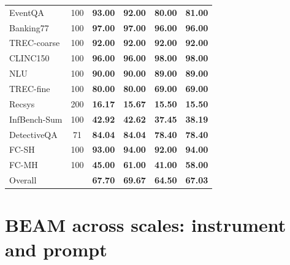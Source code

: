 \documentclass{article}
\begin{document}
\begin{table}[!htbp]
\begin{tabular}{lc>{\columncolor{oursbg}}c>{\columncolor{oursbg}}c>{\columncolor{oursbg}}c>{\columncolor{oursbg}}c}
EventQA & 100 & \textbf{93.00} & \textbf{92.00} & \textbf{80.00} & \textbf{81.00} \\
Banking77 & 100 & \textbf{97.00} & \textbf{97.00} & \textbf{96.00} & \textbf{96.00} \\
TREC-coarse & 100 & \textbf{92.00} & \textbf{92.00} & \textbf{92.00} & \textbf{92.00} \\
CLINC150 & 100 & \textbf{96.00} & \textbf{96.00} & \textbf{98.00} & \textbf{98.00} \\
NLU & 100 & \textbf{90.00} & \textbf{90.00} & \textbf{89.00} & \textbf{89.00} \\
TREC-fine & 100 & \textbf{80.00} & \textbf{80.00} & \textbf{69.00} & \textbf{69.00} \\
Recsys & 200 & \textbf{16.17} & \textbf{15.67} & \textbf{15.50} & \textbf{15.50} \\
InfBench-Sum & 100 & \textbf{42.92} & \textbf{42.62} & \textbf{37.45} & \textbf{38.19} \\
DetectiveQA & 71 & \textbf{84.04} & \textbf{84.04} & \textbf{78.40} & \textbf{78.40} \\
FC-SH & 100 & \textbf{93.00} & \textbf{94.00} & \textbf{92.00} & \textbf{94.00} \\
FC-MH & 100 & \textbf{45.00} & \textbf{61.00} & \textbf{41.00} & \textbf{58.00} \\
\midrule
Overall &  & \textbf{67.70} & \textbf{69.67} & \textbf{64.50} & \textbf{67.03} \\
\bottomrule
\end{tabular}
\end{table}

\FloatBarrier
\section{BEAM across scales: instrument and prompt}\label{app:beamscale}
\end{document}
